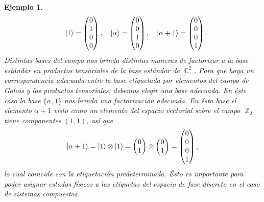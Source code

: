 \documentclass[a4paper,11pt]{report}
\DeclareMathOperator{\C}{\mathbb{C}}
\DeclareMathOperator{\Z}{\mathbb{Z}}
\newtheorem{example}{Ejemplo}
\begin{document}
\begin{example}
\[      \quad
      \ket{1}
      = \begin{pmatrix} 0\\1\\0\\0 \end{pmatrix},
      \quad
      \ket{\alpha}
      = \begin{pmatrix} 0\\0\\1\\0 \end{pmatrix},
      \quad
      \ket{\alpha+1}
      = \begin{pmatrix} 0\\0\\0\\1 \end{pmatrix}. 
    \] 
    Distintas bases del campo nos brinda distintas maneras
    de factorizar a la base estándar en productos
    tensoriales de la base estándar de $\C^2$. Para que haya
    un correspondencia adecuada entre la base etiquetada por
    elementos del campo de Galois y los productos
    tensoriales, debemos elegir una base adecuada.  En éste
    caso la base $\{\alpha, 1\}$ nos brinda una factorización
    adecuada. En
    ésta base el elemento $\alpha + 1$ visto como un
    elemento del espacio vectorial sobre el campo $\Z_2$
    tiene componentes $(1,1)$, así que 
    \[
      \ket{\alpha + 1}
      = \ket{1} \otimes \ket{1}
      = \begin{pmatrix} 0\\1 \end{pmatrix} 
      \otimes
      \begin{pmatrix} 0\\1 \end{pmatrix} 
      = \begin{pmatrix} 0\\0\\0\\1 \end{pmatrix},
    \] 
    lo cual coincide con la etiquetación predeterminada.
    Ésto es importante para poder asignar estados físicos a
    las etiquetas del espacio de fase discreto en el caso de
    sistemas compuestos.


\end{example}
\end{document}

